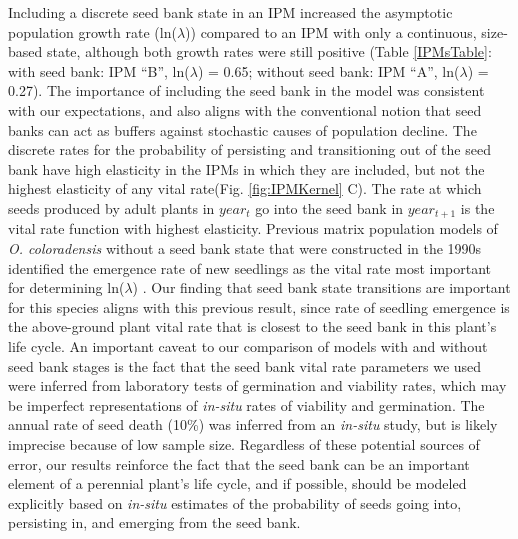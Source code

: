 \documentclass[12pt, letterpaper]{article}
\begin{document}
Including a discrete seed bank state in an IPM increased the asymptotic population growth rate (ln($\lambda$)) compared to an IPM with only a continuous, size-based state, although both growth rates were still positive (Table \ref{IPMsTable}: with seed bank: IPM “B”, ln($\lambda$) = 0.65; without seed bank: IPM “A”, ln($\lambda$) = 0.27). The importance of including the seed bank in the model was consistent with our expectations, and also aligns with the conventional notion that seed banks can act as buffers against stochastic causes of population decline. The discrete rates for the probability of persisting and transitioning out of the seed bank have high elasticity in the IPMs in which they are included, but not the highest elasticity of any vital rate(Fig. \ref{fig:IPMKernel} C). The rate at which seeds produced by adult plants in $year_{t}$ go into the seed bank in $year_{t+1}$ is the vital rate function with highest elasticity. Previous matrix population models of \textit{O. coloradensis} without a seed bank state that were constructed in the 1990s identified the emergence rate of new seedlings as the vital rate most important for determining ln($\lambda$) \cite{Floyd1998}. Our finding that seed bank state transitions are important for this species aligns with this previous result, since rate of seedling emergence is the above-ground plant vital rate that is closest to the seed bank in this plant’s life cycle. An important caveat to our comparison of models with and without seed bank stages is the fact that the seed bank vital rate parameters we used were inferred from laboratory tests of germination and viability rates, which may be imperfect representations of \textit{in-situ} rates of viability and germination. The annual rate of seed death (10\%) was inferred from an \textit{in-situ} study, but is likely imprecise because of low sample size. Regardless of these potential sources of error, our results reinforce the fact that the seed bank can be an important element of a perennial plant’s life cycle, and if possible, should be modeled explicitly based on \textit{in-situ} estimates of the probability of seeds going into, persisting in, and emerging from the seed bank.      
\end{document}
